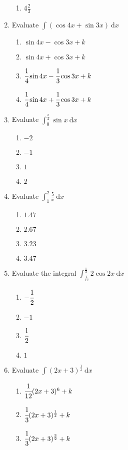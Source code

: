 \begin{multicols}{2}
\begin{enumerate}[label={\arabic*.}]
\begin{enumerate}[label={\Alph*.}]
	\item \(4\frac{2}{3}\)
	\end{enumerate}
\item Evaluate \(\displaystyle \int \left(\cos{4x} + \sin{3x}\right)\ \mathrm{d}x\)
	\begin{enumerate}[label={\Alph*.}]
	\item \(\sin{4x} - \cos{3x} + k\)
	\item \(\sin{4x} + \cos{3x} + k\)
	\item \(\cfrac{1}{4}\sin{4x} - \cfrac{1}{3}\cos{3x} + k\)
	\item \(\cfrac{1}{4}\sin{4x} + \cfrac{1}{3}\cos{3x} + k\)
	\end{enumerate}
\item Evaluate \(\displaystyle \int_{0}^{\frac{\pi}{2}} \sin{x}\ \mathrm{d}x\)
	\begin{enumerate}[label={\Alph*.}]
	\item \(-2\)
	\item \(-1\)
	\item \(1\)
	\item \(2\)
	\end{enumerate}
\item Evaluate \(\displaystyle \int_{1}^{2}\frac{5}{x}\ \mathrm{d}x\)
	\begin{enumerate}[label={\Alph*.}]
	\item \(1.47\)
	\item \(2.67\)
	\item \(3.23\)
	\item \(3.47\)
	\end{enumerate}
\item Evaluate the integral \(\displaystyle \int_{\frac{\pi}{12}}^{\frac{\pi}{4}} 2\cos{2x}\ \mathrm{d}x\)
	\begin{enumerate}[label={\Alph*.}]
	\item \(-{\cfrac{1}{2}}\)
	\item \(-1\)
	\item \(\cfrac{1}{2}\)
	\item \(1\)
	\end{enumerate}
\item Evaluate \(\displaystyle \int \left(2x+3\right)^{\frac{1}{2}}\ \mathrm{d}x\)
	\begin{enumerate}[label={\Alph*.}]
	\item \(\cfrac{1}{12}(2x+3)^6 + k\)
	\item \(\cfrac{1}{3}(2x+3)^{\frac{1}{2}} + k\)
	\item \(\cfrac{1}{3}(2x+3)^{\frac{3}{2}} + k\)

\end{enumerate}
\end{enumerate}
\end{multicols}
